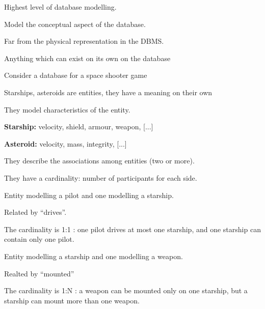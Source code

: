 \documentclass{beamer}
\begin{document}
\begin{slide}{
\item Highest level of database modelling.
\item Model the conceptual aspect of the database.
\item Far from the physical representation in the DBMS.
}\end{slide}

\begin{slide}{
\item Anything which can exist on its own on the database
\item Consider a database for a space shooter game
\item Starships, asteroids are entities, they have a meaning on their own

}\end{slide}

\begin{slide}{
\item They model characteristics of the entity.
\item \textbf{Starship:} velocity, shield, armour, weapon, [...]
\item \textbf{Asteroid:} velocity, mass, integrity, [...]

}\end{slide}

\begin{slide}{
\item They describe the associations among entities (two or more).
\item They have a cardinality: number of participants for each side.

}\end{slide}

\begin{slide}{
\item Entity modelling a pilot and one modelling a starship.
\item Related by ``drives''.
\item The cardinality is 1:1 : one pilot drives at most one starship, and one starship can contain only one pilot.

}\end{slide}

\begin{slide}{
\item Entity modelling a starship and one modelling a weapon.
\item Realted by ``mounted''
\item The cardinality is 1:N : a weapon can be mounted only on one starship, but a starship can mount more than one weapon.

}\end{slide}
\end{document}
